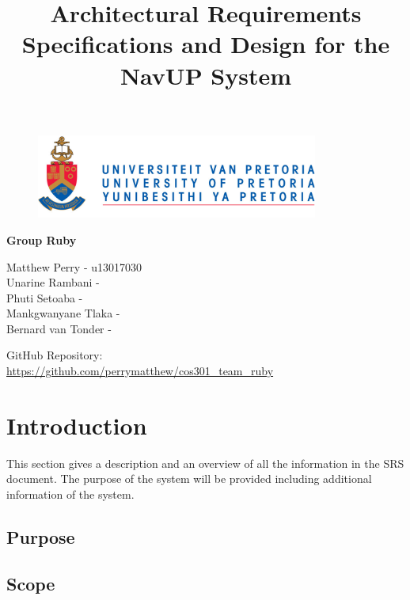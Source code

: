 \documentclass{article}
\begin{document}
		\begin{figure}[t]
			\centering
			\includegraphics[width=350px]{UP_Logo.PNG}
		\end{figure}
				\title{Architectural Requirements Specifications and Design for the NavUP System}
\maketitle
		\begin{center}
			\textbf{\newline Group Ruby} \\
		\end{center}
			
				
		\begin{flushright} \large
			Matthew Perry - u13017030 \\
			Unarine Rambani -  \\
			Phuti Setoaba -  \\
			Mankgwanyane Tlaka -  \\
			Bernard van Tonder -  \\
		\end{flushright}
		
		
		
		
		GitHub Repository: \href{https://github.com/perrymatthew/cos301_team_ruby}\\
		\url{https://github.com/perrymatthew/cos301_team_ruby}
	

\clearpage
\tableofcontents

\clearpage
\section{Introduction}

This section gives a description and an overview of all the information in the SRS document. The purpose of the system will be provided including additional information of the system.

	\subsection{Purpose}
	
	
	\subsection{Scope}
	
\end{document}
